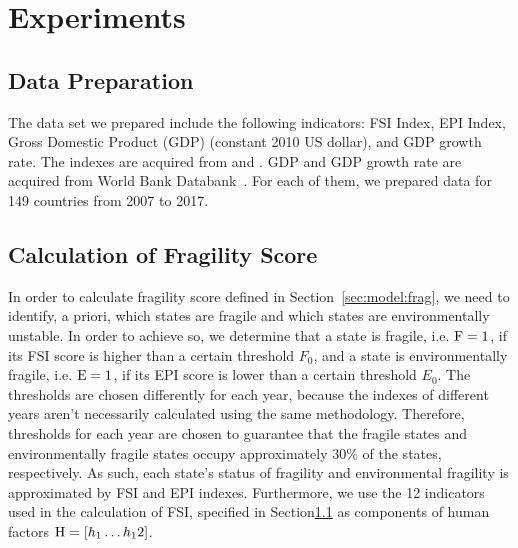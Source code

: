 \section{Experiments}
\label{sec:exp}
\subsection{Data Preparation}
\label{sec:exp:prep}

The data set we prepared include the following indicators: FSI Index, EPI Index, Gross Domestic Product (GDP) (constant 2010 US dollar), and GDP growth rate.
The indexes are acquired from \cite{FSI_index} and \cite{EPI_index}.
GDP and GDP growth rate are acquired from World Bank Databank~\cite{world_bank}. For each of them, we prepared data for 149 countries from 2007 to 2017.

\subsection{Calculation of Fragility Score}
\label{sec:exp:frag}
In order to calculate fragility score defined in Section~\ref{sec:model:frag}, we need to identify, a priori, which states are fragile and which states are environmentally unstable. 
In order to achieve so, we determine that a state is fragile, i.e. $\operatorname*{F}=1$, if its FSI score is higher than a certain threshold $F_0$, and a state is environmentally fragile, i.e. $\operatorname*{E}=1$, if its EPI score is lower than a certain threshold $E_0$. 
The thresholds are chosen differently for each year, because the indexes of different years aren't necessarily calculated using the same methodology.
Therefore, thresholds for each year are chosen to guarantee that the fragile states and environmentally fragile states occupy approximately $30\%$ of the states, respectively. As such, each state's status of fragility and environmental fragility is approximated by FSI and EPI indexes. Furthermore, we use the 12 indicators used in the calculation of FSI, specified in Section\ref{sec:exp:prep} as components of human factors $\operatorname*{{H}} = \left[ h_1\ldots h_12 \right]$.

